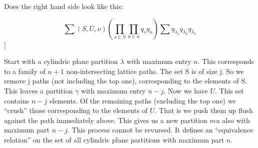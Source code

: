 \documentclass[11pt]{article}
\theoremstyle{plain}
\theoremstyle{definition}
\begin{document}
Does the right hand side look like this:

\[ \sum (S,U, \nu) (\prod_{s \in S} \prod_{u \in u} q_s q_u) \sum q_{\lambda_1} q_{\lambda_2} q_{\lambda_3} \]] 


\newpage

Start with a cylindric plane partition $\lambda$ with maximum entry $n$. This corresponds to a family of $n+1$ non-intersecting lattice paths. The set S is of size j. So we remove j paths (not including the top one), corresponding to the elements of S. This leaves a partition $\gamma$ with maximum entry $n-j$. Now we have $U$. This set contains $n-j$ elements. Of the remaining paths (excluding the top one) we ``crush'' those corresponding to the elements of $U$. That is we push them up flush against the path immediately above. This gives us a new partition $mu$ also with maximum part $n-j$. This process cannot be revursed. It defines an ``equivalence relation'' on the set of all cylindric plane partitions with maximum part $n$.
\end{document}
